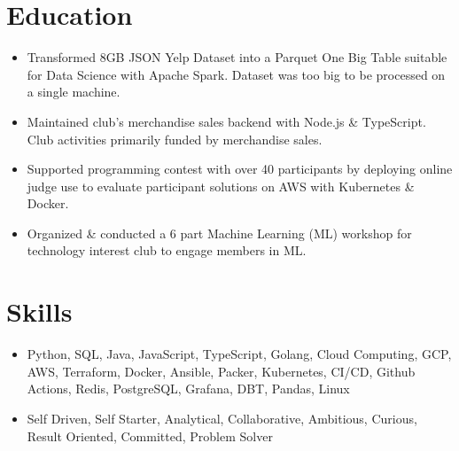 \section{Education}
\begin{itemize}
  \item Transformed 8GB JSON Yelp Dataset into a Parquet One Big Table suitable for Data Science with Apache Spark. Dataset was too big to be processed on a single machine.
  \item Maintained club's merchandise sales backend with Node.js \& TypeScript. Club activities primarily funded by merchandise sales.
\end{itemize}
\begin{itemize}
  \item Supported programming contest with over 40 participants by deploying online judge use to evaluate participant solutions on AWS with Kubernetes \& Docker.
  \item Organized \& conducted a 6 part Machine Learning  (ML) workshop for technology interest club to engage members in ML.
\end{itemize}
  
\section{Skills}
\begin{itemize}
  \item Python, SQL, Java, JavaScript, TypeScript, Golang, Cloud Computing, GCP, AWS, Terraform, Docker, Ansible, Packer, Kubernetes, CI/CD, Github Actions, Redis, PostgreSQL, Grafana, DBT, Pandas, Linux
  \item Self Driven, Self Starter, Analytical, Collaborative, Ambitious, Curious, Result Oriented, Committed, Problem Solver
\end{itemize}
